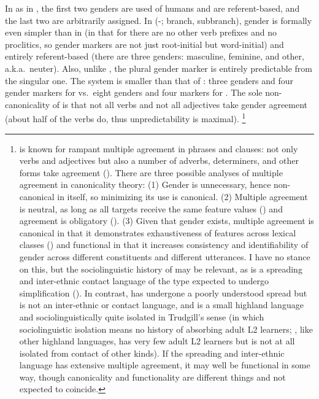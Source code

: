 \documentclass[output=collectionpaper]{langsci/langscibook}
\begin{document}
In  as in , the first two genders are used of humans and are referent-based, and the last two are arbitrarily assigned. In  (\hyp{};  branch,  subbranch), gender is formally even simpler than in  (in that for  there are no other verb prefixes and no proclitics, so gender markers are not just root-initial but word-initial) and entirely referent-based (there are three genders: masculine, feminine, and other, a.k.a.\ neuter). Also, unlike , the plural gender marker is entirely predictable from the singular one. The system is smaller than that of : three genders and four gender markers for  vs.\ eight genders and four markers for . The sole non-canonicality of  is that not all verbs and not all adjectives take gender agreement (about half of the verbs do, thus unpredictability is maximal).%
\footnote{%
\label{fn:Nich:8}%
 is known for rampant multiple agreement in phrases and clauses: not only verbs and adjectives but also a number of adverbs, determiners, and other forms take agreement (\citealt{Kibrik1985,Kibrik2003}). There are three possible analyses of multiple agreement in canonicality theory: (1) Gender is unnecessary, hence non-canonical in itself, so minimizing its use is canonical. (2) Multiple agreement is neutral, as long as all targets receive the same feature values (\citealt[513]{Corbett2016}) and agreement is obligatory (\citealt[14--15]{Corbett2006}). (3) Given that gender exists, multiple agreement is canonical in that it demonstrates exhaustiveness of features across lexical classes (\citealt[54]{Corbett2013c}) and functional in that it increases consistency and identifiability of gender across different constituents and different utterances. I have no stance on this, but the sociolinguistic history of  may be relevant, as  is a spreading and inter-ethnic contact language of the type expected to undergo simplification (\citealt{Trudgill2011}).  In contrast,  has undergone a poorly understood spread but is not an inter-ethnic or contact language, and  is a small highland language and sociolinguistically quite isolated in Trudgill's sense (in which sociolinguistic isolation means no history of absorbing adult L2 learners; , like other highland  languages, has very few adult L2 learners but is not at all isolated from contact of other kinds). If the spreading and inter-ethnic language has extensive multiple agreement, it may well be functional in some way, though canonicality and functionality are different things and not expected to coincide.
}%
\end{document}
